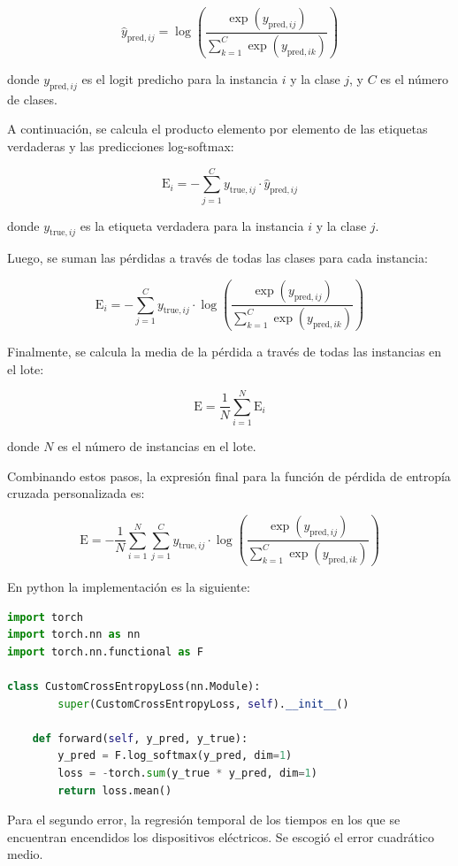 \[
\hat{y}_{\text{pred},ij} = \log \left( \frac{\exp(y_{\text{pred},ij})}{\sum_{k=1}^{C} \exp(y_{\text{pred},ik})} \right)
\]

donde \( y_{\text{pred},ij} \) es el logit predicho para la instancia \( i \) y la clase \( j \), y \( C \) es el número de clases.

A continuación, se calcula el producto elemento por elemento de las etiquetas verdaderas y las predicciones log-softmax:

\[
\text{E}_i = -\sum_{j=1}^{C} y_{\text{true},ij} \cdot \hat{y}_{\text{pred},ij}
\]

donde \( y_{\text{true},ij} \) es la etiqueta verdadera para la instancia \( i \) y la clase \( j \).

Luego, se suman las pérdidas a través de todas las clases para cada instancia:

\[
\text{E}_i = -\sum_{j=1}^{C} y_{\text{true},ij} \cdot \log \left( \frac{\exp(y_{\text{pred},ij})}{\sum_{k=1}^{C} \exp(y_{\text{pred},ik})} \right)
\]

Finalmente, se calcula la media de la pérdida a través de todas las instancias en el lote:

\[
\text{E} = \frac{1}{N} \sum_{i=1}^{N} \text{E}_i
\]

donde \( N \) es el número de instancias en el lote.

Combinando estos pasos, la expresión final para la función de pérdida de entropía cruzada personalizada es:

\[
\text{E} = -\frac{1}{N} \sum_{i=1}^{N} \sum_{j=1}^{C} y_{\text{true},ij} \cdot \log \left( \frac{\exp(y_{\text{pred},ij})}{\sum_{k=1}^{C} \exp(y_{\text{pred},ik})} \right)
\]

En python la implementación es la siguiente: 
\begin{lstlisting}[language=python]
import torch
import torch.nn as nn
import torch.nn.functional as F

class CustomCrossEntropyLoss(nn.Module):
        super(CustomCrossEntropyLoss, self).__init__()
    
    def forward(self, y_pred, y_true):
        y_pred = F.log_softmax(y_pred, dim=1)
        loss = -torch.sum(y_true * y_pred, dim=1)
        return loss.mean()
\end{lstlisting}

Para el segundo error, la regresión temporal de los tiempos en los que se encuentran encendidos los dispositivos eléctricos. Se escogió el error cuadrático medio.

